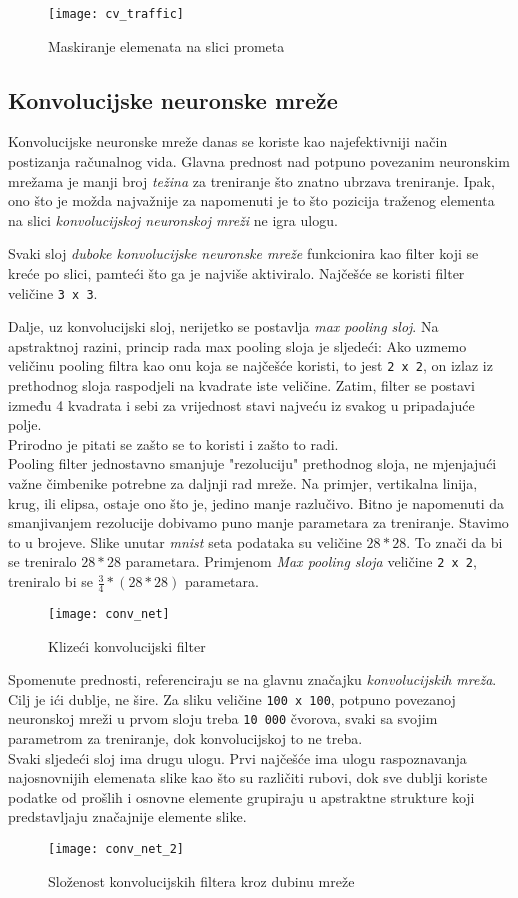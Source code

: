 \begin{figure}[h!]
	\centering
	\texttt{[image: cv\_traffic]}
	 \caption{Maskiranje elemenata na slici prometa}
 	 \label{fig:cv_traffic_1}
\end{figure}

\subsection{Konvolucijske neuronske mreže}
Konvolucijske neuronske mreže danas se koriste kao najefektivniji način postizanja računalnog vida. Glavna prednost nad potpuno povezanim neuronskim mrežama je manji broj \emph{težina} za treniranje što znatno ubrzava treniranje. Ipak, ono što je možda najvažnije za napomenuti je to što pozicija traženog elementa na slici \emph{konvolucijskoj neuronskoj mreži} ne igra ulogu. 

Svaki sloj \emph{duboke konvolucijske neuronske mreže} funkcionira kao filter koji se kreće po slici, pamteći što ga je najviše aktiviralo. Najčešće se koristi filter veličine \texttt{3 x 3}. 

Dalje, uz konvolucijski sloj, nerijetko se postavlja \emph{max pooling sloj}. Na apstraktnoj razini, princip rada max pooling sloja je sljedeći: Ako uzmemo veličinu pooling filtra kao onu koja se najčešće koristi, to jest \texttt{2 x 2}, on izlaz iz prethodnog sloja raspodjeli na kvadrate iste veličine. Zatim, filter se postavi između 4 kvadrata i sebi za vrijednost stavi najveću iz svakog u pripadajuće polje. \\ 
Prirodno je pitati se zašto se to koristi i zašto to radi. \\
Pooling filter jednostavno smanjuje "rezoluciju" prethodnog sloja, ne mjenjajući važne čimbenike potrebne za daljnji rad mreže. Na primjer, vertikalna linija, krug, ili elipsa, ostaje ono što je, jedino manje razlučivo. 
Bitno je napomenuti da smanjivanjem rezolucije dobivamo puno manje parametara za treniranje. 
Stavimo to u brojeve. Slike unutar \emph{mnist} seta podataka su veličine $28 * 28$. To znači da bi se treniralo $28*28$ parametara. Primjenom \emph{Max pooling sloja} veličine \texttt{2 x 2}, treniralo bi se $\frac{3}{4}*(28*28)$ parametara. 

\begin{figure}[h!]
	\centering
	\texttt{[image: conv\_net]}
	 \caption{Klizeći konvolucijski filter}
 	 \label{fig:conv_net_1}
\end{figure}

Spomenute prednosti, referenciraju se na glavnu značajku \emph{konvolucijskih mreža}. Cilj je ići dublje, ne šire. Za sliku veličine \texttt{100 x 100}, potpuno povezanoj neuronskoj mreži u prvom sloju treba \texttt{10 000} čvorova, svaki sa svojim parametrom za treniranje, dok konvolucijskoj to ne treba. \\
Svaki sljedeći sloj ima drugu ulogu. Prvi najčešće ima ulogu raspoznavanja najosnovnijih elemenata slike kao što su različiti rubovi, dok sve dublji koriste podatke od prošlih i osnovne elemente grupiraju u apstraktne strukture koji predstavljaju značajnije elemente slike.

\begin{figure}[h!]
	\centering
	\texttt{[image: conv\_net\_2]}
	 \caption{Složenost konvolucijskih filtera kroz dubinu mreže}
 	 \label{fig:conv_net_2}
\end{figure}
